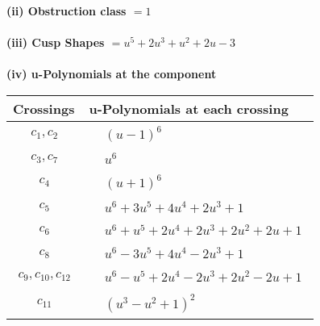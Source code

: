 \documentclass[1p]{elsarticle_modified}
\theoremstyle{definition}
\begin{document}
\flushleft \textbf{(ii) Obstruction class $= 1$}\\~\\
\flushleft \textbf{(iii) Cusp Shapes $= u^5+2 u^3+u^2+2 u-3$}\\~\\
\newpage\renewcommand{\arraystretch}{1}
\flushleft \textbf{(iv) u-Polynomials at the component}\newline \\
\begin{tabular}{m{50pt}|m{274pt}}
Crossings & \hspace{64pt}u-Polynomials at each crossing \\
\hline $$\begin{aligned}c_{1},c_{2}\end{aligned}$$&$\begin{aligned}
&(u-1)^6
\end{aligned}$\\
\hline $$\begin{aligned}c_{3},c_{7}\end{aligned}$$&$\begin{aligned}
&u^6
\end{aligned}$\\
\hline $$\begin{aligned}c_{4}\end{aligned}$$&$\begin{aligned}
&(u+1)^6
\end{aligned}$\\
\hline $$\begin{aligned}c_{5}\end{aligned}$$&$\begin{aligned}
&u^6+3 u^5+4 u^4+2 u^3+1
\end{aligned}$\\
\hline $$\begin{aligned}c_{6}\end{aligned}$$&$\begin{aligned}
&u^6+u^5+2 u^4+2 u^3+2 u^2+2 u+1
\end{aligned}$\\
\hline $$\begin{aligned}c_{8}\end{aligned}$$&$\begin{aligned}
&u^6-3 u^5+4 u^4-2 u^3+1
\end{aligned}$\\
\hline $$\begin{aligned}c_{9},c_{10},c_{12}\end{aligned}$$&$\begin{aligned}
&u^6- u^5+2 u^4-2 u^3+2 u^2-2 u+1
\end{aligned}$\\
\hline $$\begin{aligned}c_{11}\end{aligned}$$&$\begin{aligned}
&(u^3- u^2+1)^2
\end{aligned}$\\
\hline
\end{tabular}\\~\\
\end{document}
